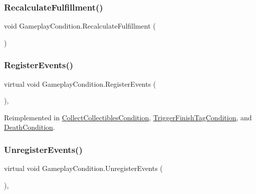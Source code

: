 \mbox{\label{class_gameplay_condition_a7a2aee3d10c9b6e7a77b5bdf447e65bd}} 
\subsubsection{\texorpdfstring{Recalculate\+Fulfillment()}{RecalculateFulfillment()}}
{\footnotesize\ttfamily void Gameplay\+Condition.\+Recalculate\+Fulfillment (\begin{DoxyParamCaption}{ }\end{DoxyParamCaption})\hspace{0.3cm}{\ttfamily [protected]}}

\mbox{\label{class_gameplay_condition_ae40b690b7dbe3977bcd4429b7bf95afb}} 
\subsubsection{\texorpdfstring{Register\+Events()}{RegisterEvents()}}
{\footnotesize\ttfamily virtual void Gameplay\+Condition.\+Register\+Events (\begin{DoxyParamCaption}{ }\end{DoxyParamCaption})\hspace{0.3cm}{\ttfamily [protected]}, {\ttfamily [virtual]}}



Reimplemented in \mbox{\hyperlink{class_collect_collectibles_condition_aaf2fbca5108425f47cd8628fd36bef43}{Collect\+Collectibles\+Condition}}, \mbox{\hyperlink{class_trigger_finish_tag_condition_a3c0f0bfe28375ed9c3c9f42c916b473f}{Trigger\+Finish\+Tag\+Condition}}, and \mbox{\hyperlink{class_death_condition_a6cb1fe3d0a6eb7df7c91df62bd549b46}{Death\+Condition}}.

\mbox{\label{class_gameplay_condition_a70bf44c9b6395036a59c58611578cac6}} 
\subsubsection{\texorpdfstring{Unregister\+Events()}{UnregisterEvents()}}
{\footnotesize\ttfamily virtual void Gameplay\+Condition.\+Unregister\+Events (\begin{DoxyParamCaption}{ }\end{DoxyParamCaption})\hspace{0.3cm}{\ttfamily [protected]}, {\ttfamily [virtual]}}



